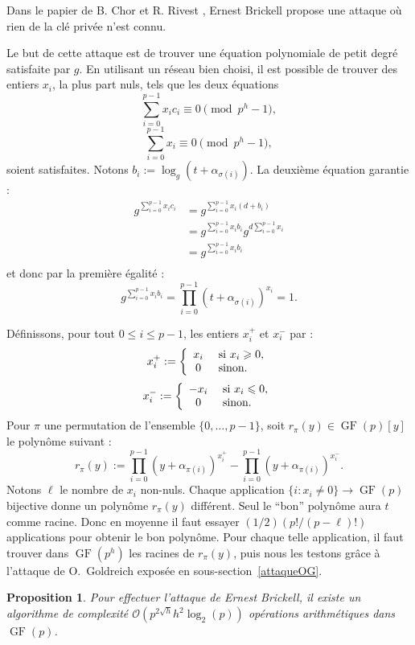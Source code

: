 \documentclass[a4paper, titlepage]{article}
\newtheorem{prop}[theo]{Proposition}
\theoremstyle{definition}
\theoremstyle{remark}
\def\O{\mathcal O}
\def\gf{\operatorname{GF}}
\begin{document}
Dans le papier de B. Chor et R. Rivest \cite[Section VII, A.5]{chorRivest1988}, Ernest Brickell propose une attaque où rien de la clé privée n'est connu.

Le but de cette attaque est de trouver une équation polynomiale de petit degré satisfaite par $g$. En utilisant un réseau bien choisi, il est possible de trouver des entiers $x_i$, la plus part nuls, tels que les deux équations
$$\sum_{i=0}^{p-1} x_ic_i \equiv 0 \pmod{p^h-1},$$
$$\sum_{i=0}^{p-1} x_i \equiv 0 \pmod{p^h-1},$$
soient satisfaites. Notons $b_i := \log_{g}(t+\alpha_{\sigma(i)})$. La deuxième équation garantie :
\begin{align*}
g^{\sum_{i=0}^{p-1} x_ic_i} &= g^{\sum_{i=0}^{p-1} x_i(d+b_i)} \\
&= g^{\sum_{i=0}^{p-1} x_ib_i} g^{d\sum_{i=0}^{p-1} x_i} \\
&= g^{\sum_{i=0}^{p-1} x_ib_i} \\
\end{align*}
et donc par la première égalité :
$$g^{\sum_{i=0}^{p-1} x_ib_i} = \prod_{i=0}^{p-1} \left(t + \alpha_{\sigma(i)}\right)^{x_i} = 1.$$ 

Définissons, pour tout $0\leqslant i\leqslant p-1$, les entiers $x_i^+$ et $x_i^-$ par :
$$x_i^+ := \left\{ \begin{array}{c l}
x_i & \text{ si } x_i \geqslant 0,\\
0 & \text{ sinon}.\\
\end{array} \right.$$
$$x_i^- := \left\{ \begin{array}{c l}
-x_i & \text{ si } x_i \leqslant 0,\\
0 & \text{ sinon}.\\
\end{array} \right.$$
Pour $\pi$ une permutation de l'ensemble $\{0, \dots, p-1\}$, soit $r_\pi(y) \in \gf(p)[y]$ le polynôme suivant :
$$r_\pi(y) := \prod_{i=0}^{p-1} (y+\alpha_{\pi(i)})^{x_i^+} - \prod_{i=0}^{p-1} (y+\alpha_{\pi(i)})^{x_i^-}.$$
Notons $\ell$ le nombre de $x_i$ non-nuls. Chaque application $\{ i : x_i \neq 0\} \rightarrow \gf(p)$ bijective donne un polynôme $r_\pi(y)$ différent. Seul le ``bon'' polynôme aura $t$ comme racine. Donc en moyenne il faut essayer $(1/2)(p!/(p-\ell)!)$ applications pour obtenir le bon polynôme. Pour chaque telle application, il faut trouver dans $\gf(p^h)$ les racines de $r_\pi(y)$, puis nous les testons grâce à l'attaque de O.~Goldreich exposée en sous-section~\ref{attaqueOG}.

\begin{prop}
Pour effectuer l'attaque de Ernest Brickell, il existe un algorithme de complexité $\O(p^{2\sqrt{h}}h^2\log_2(p))$ opérations arithmétiques dans $\gf(p)$.
\end{prop}
\end{document}
